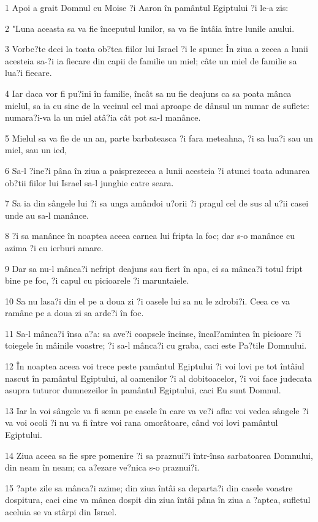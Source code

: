 \par 1 Apoi a grait Domnul cu Moise ?i Aaron în pamântul Egiptului ?i le-a zis:
\par 2 "Luna aceasta sa va fie începutul lunilor, sa va fie întâia între lunile anului.
\par 3 Vorbe?te deci la toata ob?tea fiilor lui Israel ?i le spune: În ziua a zecea a lunii acesteia sa-?i ia fiecare din capii de familie un miel; câte un miel de familie sa lua?i fiecare.
\par 4 Iar daca vor fi pu?ini în familie, încât sa nu fie deajuns ca sa poata mânca mielul, sa ia cu sine de la vecinul cel mai aproape de dânsul un numar de suflete: numara?i-va la un miel atâ?ia cât pot sa-l manânce.
\par 5 Mielul sa va fie de un an, parte barbateasca ?i fara meteahna, ?i sa lua?i sau un miel, sau un ied,
\par 6 Sa-l ?ine?i pâna în ziua a paisprezecea a lunii acesteia ?i atunci toata adunarea ob?tii fiilor lui Israel sa-l junghie catre seara.
\par 7 Sa ia din sângele lui ?i sa unga amândoi u?orii ?i pragul cel de sus al u?ii casei unde au sa-l manânce.
\par 8 ?i sa manânce în noaptea aceea carnea lui fripta la foc; dar s-o manânce cu azima ?i cu ierburi amare.
\par 9 Dar sa nu-l mânca?i nefript deajuns sau fiert în apa, ci sa mânca?i totul fript bine pe foc, ?i capul cu picioarele ?i maruntaiele.
\par 10 Sa nu lasa?i din el pe a doua zi ?i oasele lui sa nu le zdrobi?i. Ceea ce va ramâne pe a doua zi sa arde?i în foc.
\par 11 Sa-l mânca?i însa a?a: sa ave?i coapsele încinse, încal?amintea în picioare ?i toiegele în mâinile voastre; ?i sa-l mânca?i cu graba, caci este Pa?tile Domnului.
\par 12 În noaptea aceea voi trece peste pamântul Egiptului ?i voi lovi pe tot întâiul nascut în pamântul Egiptului, al oamenilor ?i al dobitoacelor, ?i voi face judecata asupra tuturor dumnezeilor în pamântul Egiptului, caci Eu sunt Domnul.
\par 13 Iar la voi sângele va fi semn pe casele în care va ve?i afla: voi vedea sângele ?i va voi ocoli ?i nu va fi între voi rana omorâtoare, când voi lovi pamântul Egiptului.
\par 14 Ziua aceea sa fie spre pomenire ?i sa praznui?i într-însa sarbatoarea Domnului, din neam în neam; ca a?ezare ve?nica s-o praznui?i.
\par 15 ?apte zile sa mânca?i azime; din ziua întâi sa departa?i din casele voastre dospitura, caci cine va mânca dospit din ziua întâi pâna în ziua a ?aptea, sufletul aceluia se va stârpi din Israel.
